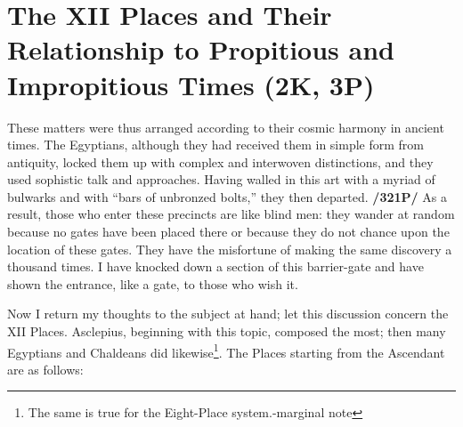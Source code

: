 \section{The XII Places and Their Relationship to Propitious and Impropitious Times (2K, 3P)}

These matters were thus arranged according to their cosmic harmony in ancient times. The Egyptians, although they had received them in simple form from antiquity, locked them up with complex and interwoven distinctions, and they used sophistic talk and approaches. 
Having walled in this art with a myriad of bulwarks and with “bars of unbronzed bolts,” they then departed. \textbf{/321P/} As a result, those who enter these precincts are like blind men: they wander at random because no gates have been placed there or because they do not chance upon the location of these gates. They have the misfortune of making the same discovery a thousand times. I have knocked down a section of this barrier-gate and have shown the entrance, like a gate, to those who wish it. 

Now I return my thoughts to the subject at hand; let this discussion concern the XII Places. Asclepius, beginning with this topic, composed the most; then many Egyptians and Chaldeans did likewise\footnote{The same is true for the Eight-Place system.-marginal note}.
The Places starting from the Ascendant are as follows:

